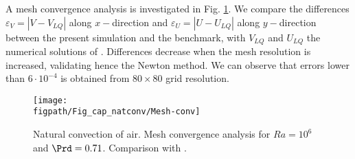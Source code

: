 
\noindent A mesh convergence analysis is investigated in Fig. \ref{fig-mesh-analysis}. 
We compare the differences $\varepsilon_V = |V - V_{LQ}|$ along $x-$direction  and $\varepsilon_U = |U - U_{LQ}|$ along $y-$direction between the present simulation and the benchmark, with $V_{LQ}$ and $U_{LQ}$ the numerical solutions of   \cite{LeQuere91}.
Differences decrease when the mesh resolution is increased, validating hence the Newton method.
We can observe that errors lower than $6 \cdot 10^{-4}$ is obtained from $80 \times 80$ grid resolution.

\begin{figure}
	\begin{center}
		\texttt{[image: \\figpath/Fig\_cap\_natconv/Mesh-conv]} 
	\end{center}
	\caption{Natural convection of air. Mesh convergence analysis for $Ra=10^6$ and $\Prd = 0.71$. Comparison with \cite{LeQuere91}.}
	\label{fig-mesh-analysis}
\end{figure}


